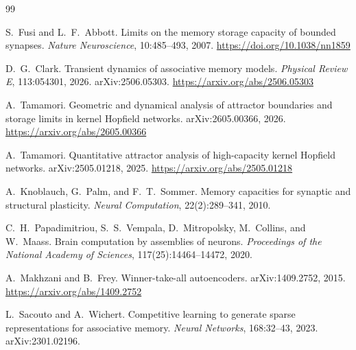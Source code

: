 \documentclass[10pt,twocolumn,a4paper]{article}
\begin{document}
\footnotesize
\begin{thebibliography}{99}
\raggedright

S.~Fusi and L.~F.~Abbott.
\newblock Limits on the memory storage capacity of bounded synapses.
\newblock \emph{Nature Neuroscience}, 10:485--493, 2007.
\newblock \url{https://doi.org/10.1038/nn1859}

D.~G.~Clark.
\newblock Transient dynamics of associative memory models.
\newblock \emph{Physical Review E}, 113:054301, 2026. arXiv:2506.05303.
\newblock \url{https://arxiv.org/abs/2506.05303}

A.~Tamamori.
\newblock Geometric and dynamical analysis of attractor boundaries and storage limits in
kernel Hopfield networks.
\newblock arXiv:2605.00366, 2026.
\newblock \url{https://arxiv.org/abs/2605.00366}

A.~Tamamori.
\newblock Quantitative attractor analysis of high-capacity kernel Hopfield networks.
\newblock arXiv:2505.01218, 2025.
\newblock \url{https://arxiv.org/abs/2505.01218}

A.~Knoblauch, G.~Palm, and F.~T.~Sommer.
\newblock Memory capacities for synaptic and structural plasticity.
\newblock \emph{Neural Computation}, 22(2):289--341, 2010.

C.~H.~Papadimitriou, S.~S.~Vempala, D.~Mitropolsky, M.~Collins, and W.~Maass.
\newblock Brain computation by assemblies of neurons.
\newblock \emph{Proceedings of the National Academy of Sciences}, 117(25):14464--14472,
2020.

A.~Makhzani and B.~Frey.
\newblock Winner-take-all autoencoders.
\newblock arXiv:1409.2752, 2015.
\newblock \url{https://arxiv.org/abs/1409.2752}

L.~Sacouto and A.~Wichert.
\newblock Competitive learning to generate sparse representations for associative memory.
\newblock \emph{Neural Networks}, 168:32--43, 2023. arXiv:2301.02196.

\end{thebibliography}
\end{document}
